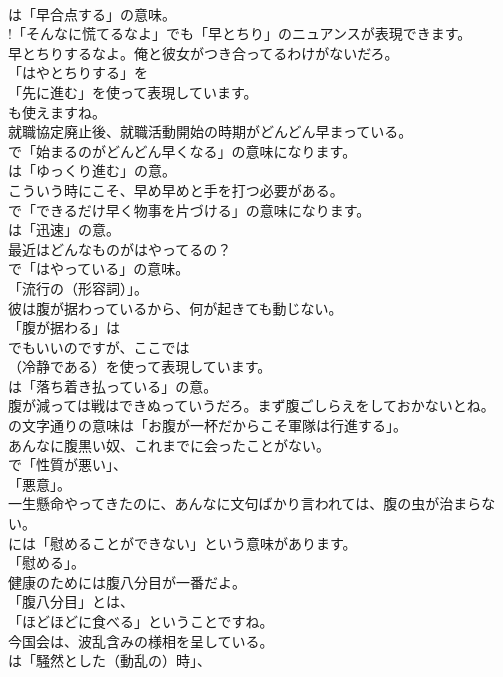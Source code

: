 \documentclass[8pt]{extreport}
\begin{document}
\begin{CJK}{UTF8}{min}
\\	は「早合点する」の意味。
\\	!「そんなに慌てるなよ」でも「早とちり」のニュアンスが表現できます。	
\\	早とちりするなよ。俺と彼女がつき合ってるわけがないだろ。 
\\	「はやとちりする」を
\\	「先に進む」を使って表現しています。
\\	も使えますね。	
\\	就職協定廃止後、就職活動開始の時期がどんどん早まっている。 
\\	で「始まるのがどんどん早くなる」の意味になります。
\\	は「ゆっくり進む」の意。	
\\	こういう時にこそ、早め早めと手を打つ必要がある。 
\\	で「できるだけ早く物事を片づける」の意味になります。
\\	は「迅速」の意。	
\\	最近はどんなものがはやってるの？ 
\\	で「はやっている」の意味。
\\	「流行の（形容詞）」。	
\\	彼は腹が据わっているから、何が起きても動じない。 
\\	「腹が据わる」は 
\\	でもいいのですが、ここでは 
\\	（冷静である）を使って表現しています。
\\	は「落ち着き払っている」の意。	
\\	腹が減っては戦はできぬっていうだろ。まず腹ごしらえをしておかないとね。 
\\	の文字通りの意味は「お腹が一杯だからこそ軍隊は行進する」。	
\\	あんなに腹黒い奴、これまでに会ったことがない。 
\\	で「性質が悪い」、
\\	「悪意」。	
\\	一生懸命やってきたのに、あんなに文句ばかり言われては、腹の虫が治まらない。 
\\	には「慰めることができない」という意味があります。
\\	「慰める」。	
\\	健康のためには腹八分目が一番だよ。 
\\	「腹八分目」とは、
\\	「ほどほどに食べる」ということですね。	
\\	今国会は、波乱含みの様相を呈している。 
\\	は「騒然とした（動乱の）時」、

\end{CJK}
\end{document}
